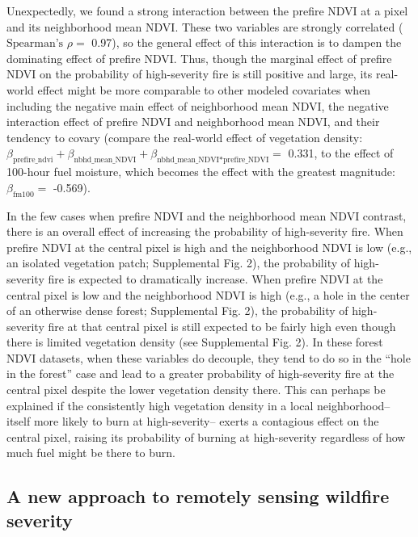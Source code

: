 \documentclass[twoside,12pt,final]{ucthesis-CA2012}
\begin{document}
\begin{ucmainmatter}
Unexpectedly, we found a strong interaction between the prefire NDVI at
a pixel and its neighborhood mean NDVI. These two variables are strongly
correlated (\(\text{Spearman's }\rho=\) 0.97), so the general effect of
this interaction is to dampen the dominating effect of prefire NDVI.
Thus, though the marginal effect of prefire NDVI on the probability of
high-severity fire is still positive and large, its real-world effect
might be more comparable to other modeled covariates when including the
negative main effect of neighborhood mean NDVI, the negative interaction
effect of prefire NDVI and neighborhood mean NDVI, and their tendency to
covary (compare the real-world effect of vegetation density:
\(\beta_{\text{prefire\_ndvi}}+\beta_{\text{nbhd\_mean\_NDVI}}+\beta_{\text{nbhd\_mean\_NDVI*prefire\_NDVI}}=\)
0.331, to the effect of 100-hour fuel moisture, which becomes the effect
with the greatest magnitude: \(\beta_{\text{fm100}}=\) -0.569).

In the few cases when prefire NDVI and the neighborhood mean NDVI
contrast, there is an overall effect of increasing the probability of
high-severity fire. When prefire NDVI at the central pixel is high and
the neighborhood NDVI is low (e.g., an isolated vegetation patch;
Supplemental Fig. 2), the probability of high-severity fire is expected
to dramatically increase. When prefire NDVI at the central pixel is low
and the neighborhood NDVI is high (e.g., a hole in the center of an
otherwise dense forest; Supplemental Fig. 2), the probability of
high-severity fire at that central pixel is still expected to be fairly
high even though there is limited vegetation density (see Supplemental
Fig. 2). In these forest NDVI datasets, when these variables do
decouple, they tend to do so in the ``hole in the forest'' case and lead
to a greater probability of high-severity fire at the central pixel
despite the lower vegetation density there. This can perhaps be
explained if the consistently high vegetation density in a local
neighborhood-- itself more likely to burn at high-severity-- exerts a
contagious effect on the central pixel, raising its probability of
burning at high-severity regardless of how much fuel might be there to
burn.

\subsection{A new approach to remotely sensing wildfire
severity}\label{a-new-approach-to-remotely-sensing-wildfire-severity}


\end{ucmainmatter}
\end{document}
